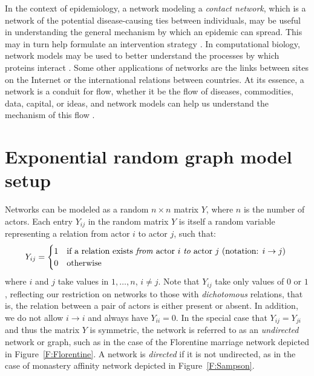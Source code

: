 In the context of epidemiology, a network modeling  
a \emph{contact network}, which is a network of the potential disease-causing ties between individuals, may be useful in understanding the general mechanism by which an epidemic can spread.  This may in turn help formulate an intervention strategy \citep*{Welch:2011}.
In computational biology, network models may be used to better understand the processes
by which proteins interact \citep*{Goldenberg:2009}.  
Some other applications of networks are the links between sites on the Internet
or the international relations between countries.  At its essence, 
a network is a conduit for flow, whether it be the flow of diseases, commodities, 
data, capital, or ideas, and network models can help us
 understand the mechanism of this flow \citep*{Kolaczyk:slides}.

\section{Exponential random graph model setup} \label{S:ERGM setup}
Networks can be modeled as a random  $n \times n$ matrix $Y$, where $n$ is 
the number of actors.
Each entry $Y_{ij}$ in the random matrix $Y$ is itself a random variable representing 
a relation from actor $i$ to actor $j$, such that:
\[
	Y_{ij} = 
	\begin{cases}
		1 & \text{if a relation exists \textit{from} actor $i$ \textit{to} actor 
$j$ (notation: $i \to j$)}\\
		0 & \text{otherwise}
	\end{cases}
	\
\]
where $i$ and $j$ take values in $1, \ldots, n$, $i \neq j$.  
Note that $Y_{ij}$ take only values of $0$ or $1$, reflecting our restriction 
on networks to those with \emph{dichotomous} relations, that is, the relation between a pair 
of actors is either present or absent.  In addition, we do not allow  
$i \to i$ and always have $Y_{ii} = 0$.  In the special case that 
$Y_{ij} = Y_{ji}$ and thus the matrix $Y$ is symmetric, the network is referred to as an
\textit{undirected} network or graph, such as in the case of the Florentine marriage 
network depicted in Figure~\ref{F:Florentine}.  A network is \textit{directed} if it is 
not undirected, as in the case of monastery affinity network depicted in 
Figure~\ref{F:Sampson}.  

